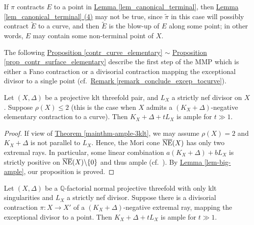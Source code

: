 \begin{rmq}
If $\pi$ contracts $E$ to a point in {\hyperref[lem_canonical_terminal]{Lemma  \ref*{lem_canonical_terminal}}}, then  {\hyperref[lem_canonical_terminal]{Lemma  \ref*{lem_canonical_terminal} (4)}} may not be true, since $\widetilde{\pi}$ in this case will  possibly contract $\widetilde{E}$ to a curve, and then $\widetilde{E}$ is the blow-up of $E$ along some point; in other words, $E$ may contain some non-terminal point of $X$.
\end{rmq}




The following 
{\hyperref[contr_curve_elementary]{Proposition   \ref*{contr_curve_elementary}}} $\sim$ {\hyperref[prop_contr_surface_elementary]{Proposition   \ref*{prop_contr_surface_elementary}}} describe the first step of the MMP which is either a Fano contraction or a divisorial contraction mapping the exceptional divisor to a single point (cf.~{\hyperref[remark_conclude_excep_tocurve]{Remark  \ref*{remark_conclude_excep_tocurve}}}).


\begin{prop}\label{contr_curve_elementary}
Let $(X,\Delta)$ be a projective klt threefold pair, and $L_X$ a strictly nef divisor on $X$.
Suppose  $\rho(X)\leqslant 2$ (this is the case when $X$ admits a $(K_X+\Delta)$-negative  elementary contraction to a curve).
Then $K_X+\Delta+tL_X$ is ample for  $t\gg 1$.
\end{prop}
\begin{proof}
If view of  {\hyperref[mainthm-ample-3klt]{Theorem \ref*{mainthm-ample-3klt}}}, we may assume $\rho(X)=2$ and $K_X+\Delta$ is not parallel to $L_X$.  
Hence, the Mori cone $\overline{\textup{NE}}(X)$ has only two extremal rays. 
In particular, some linear combination $a(K_X+\Delta)+bL_X$ is strictly positive on $\overline{\textup{NE}}(X)\backslash \{0\}$ and thus ample (cf.~\cite[Theorem 1.18]{KM98}).
By {\hyperref[lem-big-ample]{Lemma  \ref*{lem-big-ample}}}, our proposition is proved.
\end{proof}


\begin{prop}\label{prop_Exc_surface_point}
Let $(X,\Delta)$ be a $\mathbb{Q}$-factorial normal  projective threefold with only  klt singularities and $L_X$ a strictly nef divisor.
Suppose there is a divisorial contraction $\pi:X\to X'$ of a $(K_X+\Delta)$-negative extremal ray, mapping the exceptional divisor to a point.	 
Then $K_X+\Delta+tL_X$ is ample for  $t\gg1$.
\end{prop}

